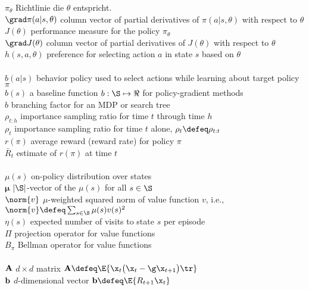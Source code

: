 \documentclass[a4paper,titlepage]{article}
\numberwithin{equation}{section} %
\begin{document}
\>$\pi_{\theta}$           \> Richtlinie die $\theta$ entspricht.\\
\>$\grad\pi(a|s,\theta)$ \>column vector of partial derivatives of $\pi(a|s,\theta)$ with respect to $\theta$\\
\>$J(\theta)$            \> performance measure for the policy $\pi_{\theta}$\\
\>$\grad J(\theta)$      \> column vector of partial derivatives of $J(\theta)$ with respect to $\theta$\\
\>$h(s,a,\theta)$        \> preference for selecting action $a$ in state $s$ based on $\theta$\\
\\
\>$b(a|s)$            \> behavior policy used to select actions while learning about target policy $\pi$ \\
\>$b(s)$              \> a baseline function $b:\S\mapsto\Re$ for policy-gradient methods\\
\>$b$                 \> branching factor for an MDP or search tree \\
\>$\rho_{t:h}$        \> importance sampling ratio for time $t$ through time $h$ \\
\>$\rho_{t}$          \> importance sampling ratio for time $t$ alone, $\rho_t\defeq\rho_{t:t}$\\
\>$r(\pi)$            \> average reward (reward rate) for policy $\pi$ \\
\>$\bar R_t$          \> estimate of $r(\pi)$ at time $t$\\
\\
\>$\mu(s)$            \> on-policy distribution over states \\
\>$\bm\mu$            \> $|\S|$-vector of the $\mu(s)$ for all $s\in\S$\\
\>$\norm{v}$          \> $\mu$-weighted squared norm of value function $v$, i.e., $\norm{v}\defeq\sum_{s\in\S} \mu(s)v(s)^2$\\
\>$\eta(s)$           \> expected number of visits to state $s$ per episode\\
\>$\Pi$               \> projection operator for value functions \\
\>$B_\pi$             \> Bellman operator for value functions \\
\\
\>${\bf A}$           \> $d\times d$ matrix ${\bf A}\defeq\E{\x_t\bigl(\x_t-\g\x_{t+1}\bigr)\tr}$\\
\>${\bf b}$           \> $d$-dimensional vector ${\bf b}\defeq\E{R_{t+1}\x_t}$\\
\end{document}
